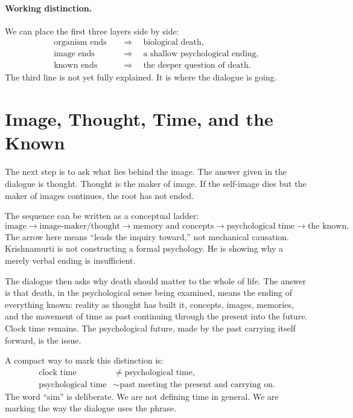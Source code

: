 \paragraph{Working distinction.}
We can place the first three layers side by side:
\begin{align}
\text{organism ends} &\quad \Rightarrow \quad \text{biological death}, \\
\text{image ends} &\quad \Rightarrow \quad \text{a shallow psychological ending}, \\
\text{known ends} &\quad \Rightarrow \quad \text{the deeper question of death}.
\end{align}
The third line is not yet fully explained. It is where the dialogue is going.

\section{Image, Thought, Time, and the Known}

The next step is to ask what lies behind the image. The answer given in the dialogue is thought. Thought is the maker of image. If the self-image dies but the maker of images continues, the root has not ended.

The sequence can be written as a conceptual ladder:
\begin{equation}
\text{image}
\longrightarrow
\text{image-maker/thought}
\longrightarrow
\text{memory and concepts}
\longrightarrow
\text{psychological time}
\longrightarrow
\text{the known}.
\end{equation}
The arrow here means ``leads the inquiry toward,'' not mechanical causation. Krishnamurti is not constructing a formal psychology. He is showing why a merely verbal ending is insufficient.

The dialogue then asks why death should matter to the whole of life. The answer is that death, in the psychological sense being examined, means the ending of everything known: reality as thought has built it, concepts, images, memories, and the movement of time as past continuing through the present into the future. Clock time remains. The psychological future, made by the past carrying itself forward, is the issue.

A compact way to mark this distinction is:
\begin{align}
\text{clock time} &\neq \text{psychological time}, \\
\text{psychological time} &\sim \text{past meeting the present and carrying on}.
\end{align}
The word ``sim'' is deliberate. We are not defining time in general. We are marking the way the dialogue uses the phrase.

